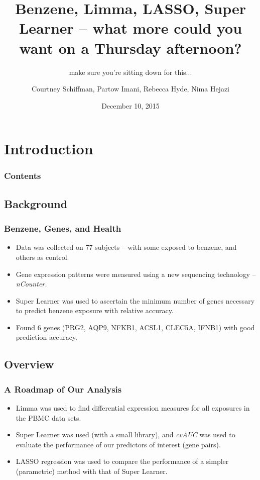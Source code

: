 \documentclass{beamer}
\title{Benzene, Limma, LASSO, Super Learner -- what more could you want on a Thursday afternoon?}
\subtitle{make sure you're sitting down for this...}
\author{Courtney Schiffman, Partow Imani, Rebecca Hyde, Nima Hejazi}
\institute[UC Berkeley]{University of California, Berkeley}
\date{December 10, 2015}
\begin{document}
\frame{\titlepage}

\section[Outline]{}
\frame{\tableofcontents}


\section{Introduction}

\begin{frame}
	\frametitle{Contents}
	\tableofcontents[currentsection,currentsubsection,hideothersubsections,sectionstyle=show/shaded] 
\end{frame}


\subsection{Background}

\begin{frame}[fragile]
  	\frametitle{Benzene, Genes, and Health}
	\begin{itemize}
  			\item Data was collected on 77 subjects -- with some exposed to benzene, and others as control.
			\item Gene expression patterns were measured using a new sequencing technology -- \textit{nCounter.}
 			\item Super Learner was used to ascertain the minimum number of genes necessary to predict benzene exposure with relative accuracy.
  			\item Found 6 genes (PRG2, AQP9, NFKB1, ACSL1, CLEC5A, IFNB1) with good prediction accuracy.
  		\end{itemize}
\end{frame}

\subsection{Overview}

\begin{frame}[fragile]
  	\frametitle{A Roadmap of Our Analysis}
 		\begin{itemize}
  			\item Limma was used to find differential expression measures for all exposures in the PBMC data sets.
			\item Super Learner was used (with a small library), and \textit{cvAUC} was used to evaluate the performance of our predictors of interest (gene pairs).
			\item LASSO regression was used to compare the performance of a simpler (parametric) method with that of Super Learner.
  		\end{itemize}
\end{frame}
\end{document}
